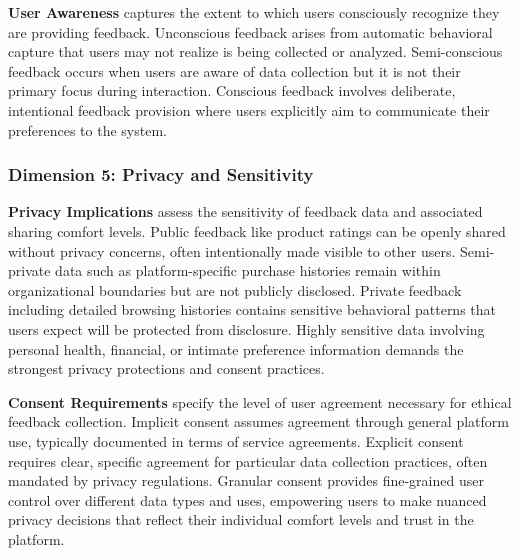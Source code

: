 \textbf{User Awareness} captures the extent to which users consciously recognize they are providing feedback. Unconscious feedback arises from automatic behavioral capture that users may not realize is being collected or analyzed. Semi-conscious feedback occurs when users are aware of data collection but it is not their primary focus during interaction. Conscious feedback involves deliberate, intentional feedback provision where users explicitly aim to communicate their preferences to the system.

\subsubsection{Dimension 5: Privacy and Sensitivity}

\textbf{Privacy Implications} assess the sensitivity of feedback data and associated sharing comfort levels. Public feedback like product ratings can be openly shared without privacy concerns, often intentionally made visible to other users. Semi-private data such as platform-specific purchase histories remain within organizational boundaries but are not publicly disclosed. Private feedback including detailed browsing histories contains sensitive behavioral patterns that users expect will be protected from disclosure. Highly sensitive data involving personal health, financial, or intimate preference information demands the strongest privacy protections and consent practices.

\textbf{Consent Requirements} specify the level of user agreement necessary for ethical feedback collection. Implicit consent assumes agreement through general platform use, typically documented in terms of service agreements. Explicit consent requires clear, specific agreement for particular data collection practices, often mandated by privacy regulations. Granular consent provides fine-grained user control over different data types and uses, empowering users to make nuanced privacy decisions that reflect their individual comfort levels and trust in the platform.

